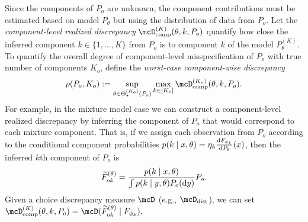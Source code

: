 Since the components of $P_{o}$ are unknown, the component contributions must be estimated based on model $P_{\theta}$ but 
using the distribution of data from $P_{o}$. 
Let the \emph{component-level realized discrepancy} $\compDisc^{(K)}(\theta, k, P_{o})$ quantify
how close the inferred component $k \in \{1,\dots,K\}$ from $P_{o}$ is to component $k$ of the model
$P_{\theta}^{(K)}$. 
To quantify the overall degree of component-level misspecification of $P_o$ with true number of components $K_o$,
define the \emph{worst-case component-wise discrepancy}
\[
 \rho(P_{o}, K_{o}) \defas  \sup_{\theta \in \Theta_{\star}^{(K_{o})}(P_{o})} \max_{k \in [K_{o}]} \compDisc^{(K_{o})}(\theta, k, P_{o}).
\]
For example, in the mixture model case we can construct a component-level realized discrepancy by inferring
the component of $P_o$ that would correspond to each mixture component.
That is, if we assign each observation from $P_o$ according to the conditional component probabilities 
$p(k \mid x, \theta) = \eta_{k} \frac{\mathrm{d} F_{\phi_k}}{\mathrm{d} P_{\theta}}(x)$, 
then the inferred $k$th component of $P_o$ is 
\begin{align}
	\widetilde{F}^{(\theta)}_{ok} = \frac{p(k \mid x, \theta)}{\int p(k \mid y, \theta) P_o(\dee y)} P_o. 
\end{align}
Given a choice discrepancy measure $\mcD$ (e.g., $\distDisc$), we can set 
$
\compDisc^{(K)}(\theta, k, P_{o}) = \mcD(\widetilde{F}^{(\theta)}_{ok} \mid F_{\phi_k}).
$

